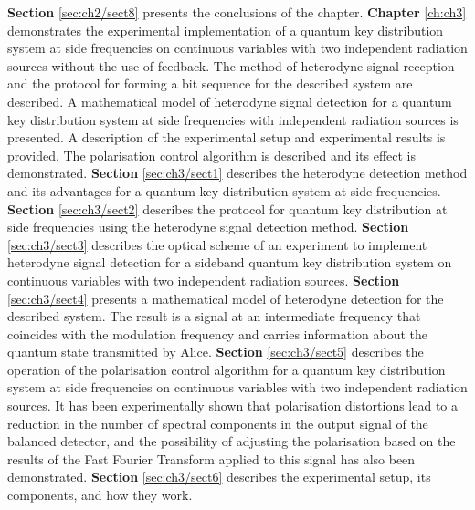 \newline \textbf{Section} \ref{sec:ch2/sect8} presents the conclusions of the chapter.
\newline \textbf{Chapter} \ref{ch:ch3} demonstrates the experimental implementation of a quantum key distribution system at side frequencies on continuous variables with two independent radiation sources without the use of feedback. The method of heterodyne signal reception and the protocol for forming a bit sequence for the described system are described.  A mathematical model of heterodyne signal detection for a quantum key distribution system at side frequencies with independent radiation sources is presented. A description of the experimental setup and experimental results is provided. The polarisation control algorithm is described and its effect is demonstrated.
\newline \textbf{Section} \ref{sec:ch3/sect1} describes the heterodyne detection method and its advantages for a quantum key distribution system at side frequencies.
\newline \textbf{Section} \ref{sec:ch3/sect2} describes the protocol for quantum key distribution at side frequencies using the heterodyne signal detection method.
\newline \textbf{Section} \ref{sec:ch3/sect3} describes the optical scheme of an experiment to implement heterodyne signal detection for a sideband quantum key distribution system on continuous variables with two independent radiation sources.
\newline \textbf{Section} \ref{sec:ch3/sect4} presents a mathematical model of heterodyne detection for the described system. The result is a signal at an intermediate frequency that coincides with the modulation frequency and carries information about the quantum state transmitted by Alice.
\newline \textbf{Section} \ref{sec:ch3/sect5} describes the operation of the polarisation control algorithm for a quantum key distribution system at side frequencies on continuous variables with two independent radiation sources. It has been experimentally shown that polarisation distortions lead to a reduction in the number of spectral components in the output signal of the balanced detector, and the possibility of adjusting the polarisation based on the results of the Fast Fourier Transform applied to this signal has also been demonstrated.
\newline \textbf{Section} \ref{sec:ch3/sect6} describes the experimental setup, its components, and how they work.
